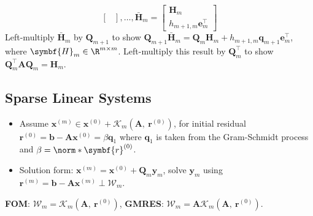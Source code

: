 \documentclass{article}
\begin{document}
\begin{minipage}[t]{126.1962963mm}
\begin{equation*}
\begin{bmatrix}
        \end{bmatrix}
        , \ldots,
        \bar{\symbf{H}}_m =
        \begin{bmatrix}
            \symbf{H}_m \\
            h_{m+1,m} \symbf{e}_m^\top
        \end{bmatrix}
    \end{equation*}
    Left-multiply \(\bar{\symbf{H}}_m\) by \(\symbf{Q}_{m+1}\) to show
    \(\symbf{Q}_{m+1} \bar{\symbf{H}}_m = \symbf{Q}_m \symbf{H}_m + h_{m+1,m} \symbf{q}_{m+1} \symbf{e}_m^\top\),
    where \(\symbf{H}_m \in \R^{m \times m}\). Left-multiply this result
    by \(\symbf{Q}_m^\top\) to show \(\symbf{Q}_m^\top \symbf{A} \symbf{Q}_m = \symbf{H}_m\).
    \subsection{Sparse Linear Systems}
    \begin{itemize}
        \item Assume \(\symbf{x}^{\left( m \right)} \in
              \symbf{x}^{\left( 0 \right)} + \mathcal{K}_m\left(
              \symbf{A},\: \symbf{r}^{\left( 0 \right)} \right)\), for
              initial residual \(\symbf{r}^{\left( 0 \right)} =
              \symbf{b} - \symbf{A} \symbf{x}^{\left( 0 \right)} =
              \beta \symbf{q}_1\) where \(\symbf{q}_1\) is taken from
              the Gram-Schmidt process and \(\beta =
              \norm*{\symbf{r}^{\left( 0 \right)}}\).
        \item Solution form: \(\symbf{x}^{\left( m \right)} =
              \symbf{x}^{\left( 0 \right)} + \symbf{Q}_m \symbf{y}_m\),
              solve \(\symbf{y}_m\) using \(\symbf{r}^{\left( m
              \right)} = \symbf{b} - \symbf{A} \symbf{x}^{\left( m
              \right)} \perp \symbf{\mathcal{W}}_m\).
    \end{itemize}
    \textbf{FOM}: \(\symbf{\mathcal{W}}_m = \symbf{\mathcal{K}}_m\left( \symbf{A},\: \symbf{r}^{\left( 0 \right)} \right)\),
    \textbf{GMRES}: \(\symbf{\mathcal{W}}_m = \symbf{A} \symbf{\mathcal{K}}_m\left( \symbf{A},\: \symbf{r}^{\left( 0 \right)} \right)\).

\end{minipage}
\end{document}
